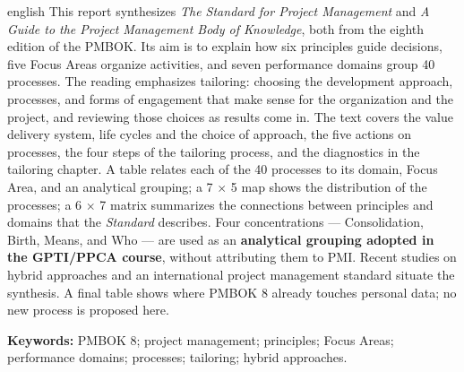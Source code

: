\documentclass[12pt,a4paper,article,oneside,english,brazil]{abntex2}
\begin{document}
\begin{resumo}[Abstract]
\begin{otherlanguage*}{english}
This report synthesizes \textit{The Standard for Project Management} and \textit{A Guide to the Project Management Body of Knowledge}, both from the eighth edition of the PMBOK. Its aim is to explain how six principles guide decisions, five Focus Areas organize activities, and seven performance domains group 40 processes. The reading emphasizes tailoring: choosing the development approach, processes, and forms of engagement that make sense for the organization and the project, and reviewing those choices as results come in. The text covers the value delivery system, life cycles and the choice of approach, the five actions on processes, the four steps of the tailoring process, and the diagnostics in the tailoring chapter. A table relates each of the 40 processes to its domain, Focus Area, and an analytical grouping; a 7 \ensuremath{\times} 5 map shows the distribution of the processes; a 6 \ensuremath{\times} 7 matrix summarizes the connections between principles and domains that the \textit{Standard} describes. Four concentrations — Consolidation, Birth, Means, and Who — are used as an \textbf{analytical grouping adopted in the GPTI/PPCA course}, without attributing them to PMI. Recent studies on hybrid approaches and an international project management standard situate the synthesis. A final table shows where PMBOK 8 already touches personal data; no new process is proposed here.

\vspace{\onelineskip}
\noindent\textbf{Keywords:} PMBOK 8; project management; principles; Focus Areas; performance domains; processes; tailoring; hybrid approaches.
\end{otherlanguage*}
\end{resumo}

\clearpage

\tableofcontents*
\clearpage
\listoffigures*
\clearpage
\listoftables*
\clearpage
\end{document}
